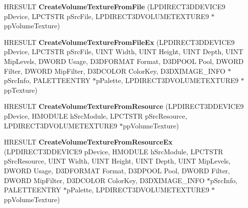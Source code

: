 \begin{DoxyCompactItemize}
\item 
\hypertarget{class_c_d_x_u_t_resource_cache_aeaf7cd870d8f048f32566aa2964e8b3e}{H\+R\+E\+S\+U\+L\+T {\bfseries Create\+Volume\+Texture\+From\+File} (L\+P\+D\+I\+R\+E\+C\+T3\+D\+D\+E\+V\+I\+C\+E9 p\+Device, L\+P\+C\+T\+S\+T\+R p\+Src\+File, L\+P\+D\+I\+R\+E\+C\+T3\+D\+V\+O\+L\+U\+M\+E\+T\+E\+X\+T\+U\+R\+E9 $\ast$pp\+Volume\+Texture)}\label{class_c_d_x_u_t_resource_cache_aeaf7cd870d8f048f32566aa2964e8b3e}

\item 
\hypertarget{class_c_d_x_u_t_resource_cache_a6fdd52b77094e786e6c4eb6d19c4ec11}{H\+R\+E\+S\+U\+L\+T {\bfseries Create\+Volume\+Texture\+From\+File\+Ex} (L\+P\+D\+I\+R\+E\+C\+T3\+D\+D\+E\+V\+I\+C\+E9 p\+Device, L\+P\+C\+T\+S\+T\+R p\+Src\+File, U\+I\+N\+T Width, U\+I\+N\+T Height, U\+I\+N\+T Depth, U\+I\+N\+T Mip\+Levels, D\+W\+O\+R\+D Usage, D3\+D\+F\+O\+R\+M\+A\+T Format, D3\+D\+P\+O\+O\+L Pool, D\+W\+O\+R\+D Filter, D\+W\+O\+R\+D Mip\+Filter, D3\+D\+C\+O\+L\+O\+R Color\+Key, D3\+D\+X\+I\+M\+A\+G\+E\+\_\+\+I\+N\+F\+O $\ast$p\+Src\+Info, P\+A\+L\+E\+T\+T\+E\+E\+N\+T\+R\+Y $\ast$p\+Palette, L\+P\+D\+I\+R\+E\+C\+T3\+D\+V\+O\+L\+U\+M\+E\+T\+E\+X\+T\+U\+R\+E9 $\ast$pp\+Texture)}\label{class_c_d_x_u_t_resource_cache_a6fdd52b77094e786e6c4eb6d19c4ec11}

\item 
\hypertarget{class_c_d_x_u_t_resource_cache_aa016831002fa2b54bd7cea38072c9a5c}{H\+R\+E\+S\+U\+L\+T {\bfseries Create\+Volume\+Texture\+From\+Resource} (L\+P\+D\+I\+R\+E\+C\+T3\+D\+D\+E\+V\+I\+C\+E9 p\+Device, H\+M\+O\+D\+U\+L\+E h\+Src\+Module, L\+P\+C\+T\+S\+T\+R p\+Src\+Resource, L\+P\+D\+I\+R\+E\+C\+T3\+D\+V\+O\+L\+U\+M\+E\+T\+E\+X\+T\+U\+R\+E9 $\ast$pp\+Volume\+Texture)}\label{class_c_d_x_u_t_resource_cache_aa016831002fa2b54bd7cea38072c9a5c}

\item 
\hypertarget{class_c_d_x_u_t_resource_cache_a0ffaceddcccad20ae27475f698bd884d}{H\+R\+E\+S\+U\+L\+T {\bfseries Create\+Volume\+Texture\+From\+Resource\+Ex} (L\+P\+D\+I\+R\+E\+C\+T3\+D\+D\+E\+V\+I\+C\+E9 p\+Device, H\+M\+O\+D\+U\+L\+E h\+Src\+Module, L\+P\+C\+T\+S\+T\+R p\+Src\+Resource, U\+I\+N\+T Width, U\+I\+N\+T Height, U\+I\+N\+T Depth, U\+I\+N\+T Mip\+Levels, D\+W\+O\+R\+D Usage, D3\+D\+F\+O\+R\+M\+A\+T Format, D3\+D\+P\+O\+O\+L Pool, D\+W\+O\+R\+D Filter, D\+W\+O\+R\+D Mip\+Filter, D3\+D\+C\+O\+L\+O\+R Color\+Key, D3\+D\+X\+I\+M\+A\+G\+E\+\_\+\+I\+N\+F\+O $\ast$p\+Src\+Info, P\+A\+L\+E\+T\+T\+E\+E\+N\+T\+R\+Y $\ast$p\+Palette, L\+P\+D\+I\+R\+E\+C\+T3\+D\+V\+O\+L\+U\+M\+E\+T\+E\+X\+T\+U\+R\+E9 $\ast$pp\+Volume\+Texture)}\label{class_c_d_x_u_t_resource_cache_a0ffaceddcccad20ae27475f698bd884d}


\end{DoxyCompactItemize}
